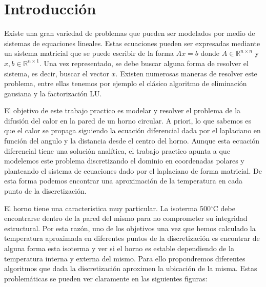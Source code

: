 \section{Introducción}

Existe una gran variedad de problemas que pueden ser modelados por medio de sistemas de equaciones lineales. Estas ecuaciones pueden ser expresadas mediante un sistema matricial que se puede escribir de la forma $Ax = b$ donde $A \in \mathbb{R}^{n \times n}$ y $x,b \in \mathbb{R}^{n \times 1}$. Una vez representado, se debe buscar alguna forma de resolver el sistema, es decir, buscar el vector $x$. Existen numerosas maneras de resolver este problema, entre ellas tenemos por ejemplo el clásico algoritmo de eliminación gausiana y la factorización LU.

El objetivo de este trabajo practico es modelar y resolver el problema de la difusión del calor en la pared de un horno circular. A priori, lo que sabemos es que el calor se propaga siguiendo la ecuación diferencial dada por el laplaciano en función del angulo y la distancia desde el centro del horno. Aunque esta ecuación diferencial tiene una solución analítica, el trabajo practico apunta a que modelemos este problema discretizando el dominio en coordenadas polares y planteando el sistema de ecuaciones dado por el laplaciano de forma matricial. De esta forma podemos encontrar una aproximación de la temperatura en cada punto de la discretización.

El horno tiene una característica muy particular.  La isoterma 500$^{\circ}$C debe encontrarse dentro de la pared del mismo para no comprometer su integridad estructural. Por esta razón, uno de los objetivos una vez que hemos calculado la temperatura aproximada en diferentes puntos de la discretización es encontrar de alguna forma esta isoterma y ver si el horno es estable dependiendo de la temperatura interna y externa del mismo. Para ello propondremos diferentes algoritmos que dada la discretización aproximen la ubicación de la misma. Estas problemáticas se pueden ver claramente en las siguientes figuras:

